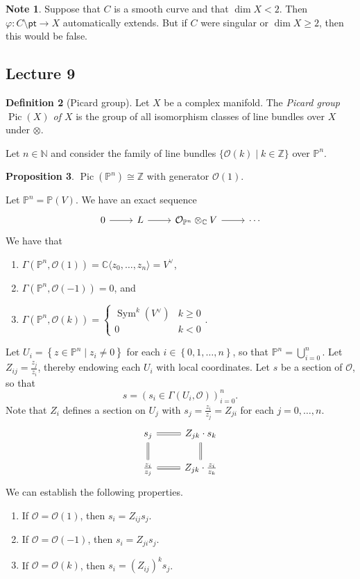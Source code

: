 \documentclass[10pt,letterpaper,cm]{nupset}
\theoremstyle{definition}
\newtheorem{defn}{Definition}[subsection]
\newtheorem{note}[defn]{Note}
\theoremstyle{theorem}
\newtheorem{prop}[defn]{Proposition}
\theoremstyle{remark}
\newcommand{\C}{\mathbb C}
\newcommand{\N}{\mathbb N}
\renewcommand{\O}{\mathcal O}
\renewcommand{\P}{\mathbb P}
\newcommand{\Z}{\mathbb Z}
\newcommand{\1}{\mathbb{1}}
\newcommand{\0}{\vec 0}
\newcommand{\pt}{\mathsf{pt}}
\DeclareMathOperator{\pic}{Pic}
\DeclareMathOperator{\sym}{Sym}
\newcommand{\be}{\begin{enumerate}}
\newcommand{\ee}{\end{enumerate}}
\begin{document}
\begin{note}
Suppose that $C$ is a smooth curve and that $\dim{X} < 2$. Then $\varphi : C \setminus \pt \to X$ automatically extends.  But if $C$ were singular or $\dim{X} \geq 2$, then this would be false.
\end{note}

\subsection{Lecture 9}

\begin{defn}[Picard group]
Let $X$ be a complex manifold. The \textit{Picard group $\pic(X)$ of $X$} is the group of all isomorphism classes of line bundles over $X$ under $\otimes$.
\end{defn}

Let $n\in \N$ and consider the family of line bundles $\{\O(k) \mid k \in \Z\}$ over $\P^n$.

\begin{prop}
$\pic\left(\P^n\right) \cong \Z$ with generator $\O(1)$. 
\end{prop}

Let $\P^n = \P(V)$. We have an exact sequence
\[
\begin{tikzcd}
0 \arrow[r] & L \arrow[r] & \O_{\P^n}\otimes_{\C} V \arrow[r] & \cdots
\end{tikzcd}
\]
We have that
\be
\item $\Gamma\left(\P^n , \O(1)\right) = \C\langle z_0, \ldots, z_n\rangle = V^{\vee}$,
\item $\Gamma \left(\P^n, \O({-1})\right) =0$, and
\item $\Gamma \left(\P^n, \O(k)\right) = \begin{cases} \sym^k\left(V^{\vee}\right) & k\geq0 \\ 0 & k<0\end{cases}$.
\ee

Let $U_i = \left\{z \in \P^n \mid z_i \ne 0\right\}$ for each $i\in \left\{0, 1, \ldots, n\right\}$, so that $\P^n = \bigcup_{i=0}^n$. Let $Z_{ij} = \frac{z_j}{z_i}$, thereby endowing each $U_i$ with local coordinates. Let $s$ be a section of $\O$, so that $$s = \left(s_i \in \Gamma\left(U_i, \O\right)\right)_{i=0}^n.$$ Note that $Z_i$ defines a section on $U_j$ with $s_j = \frac{z_i}{z_j} = Z_{ji}$ for each $j=0, \ldots, n$. 
\[
\begin{tikzcd}
s_j \arrow[r, equals] \arrow[d, equals]   & Z_{jk}\cdot s_k \arrow[d, equals]  \\
\frac{z_i}{z_j} \arrow[r, equals] & Z_{jk}\cdot\frac{z_i}{z_k}
\end{tikzcd}
\]
We can establish the following properties.
\be
\item If $\O= \O(1)$, then $s_i = Z_{ij}s_j$.
\item If $\O = \O({-1})$, then $s_i = Z_{ji}s_j$.
\item If $\O = \O(k)$, then $s_i = \left(Z_{ij}\right)^ks_j$.
\ee
\end{document}

